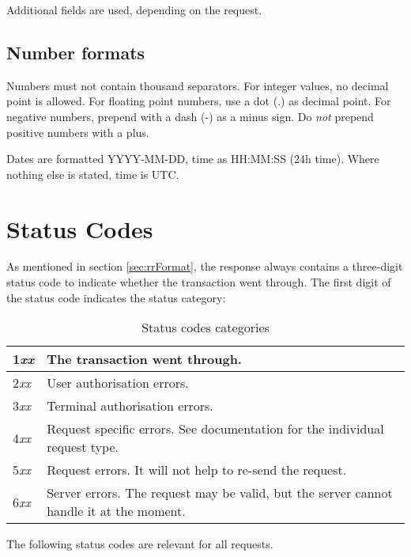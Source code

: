 \documentclass[a4paper,11pt]{article}
\begin{document}
Additional fields are used, depending on the request.

\subsection{Number formats}
Numbers must not contain thousand separators. For integer values, no
decimal point is allowed. For floating point numbers, use a dot (.) as
decimal point. For negative numbers, prepend with a dash (-) as a
minus sign. Do \emph{not} prepend positive numbers with a plus. 

Dates are formatted YYYY-MM-DD, time as HH:MM:SS (24h time). Where
nothing else is stated, time is UTC.


\section{Status Codes}\label{sec:statusCodes} 

As mentioned in section \ref{sec:rrFormat}, the response always
contains a three-digit status code to indicate whether the transaction went
through. The first digit of the status code indicates the status category:   

\begin{table}[!h]
  \begin{tabular}{|l|l|}
    \hline
      1\emph{xx} & The transaction went through. \\\hline
      2\emph{xx} & User authorisation errors.\\\hline
      3\emph{xx} & Terminal authorisation errors.\\\hline
      4\emph{xx} & Request specific errors. See documentation for the
                   individual request type.\\\hline
      5\emph{xx} & Request errors. It will not help to re-send the
                   request.\\\hline
      6\emph{xx} & Server errors. The request may be valid, but the
                   server cannot handle it at the moment.\\\hline 
  \end{tabular} 
  \caption{Status codes categories}
\end{table}



The following status codes are relevant for all requests.
\end{document}
